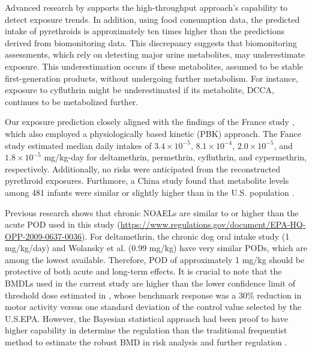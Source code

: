 \documentclass[toxics,article,submit,pdftex,moreauthors]{Definitions/mdpi}
\begin{document}
Advanced research by \citet{stanfield2024characterizing} supports the
high-throughput approach's capability to detect exposure trends. In
addition, using food consumption data, the predicted intake of
pyrethroids is approximately ten times higher than the predictions
derived from biomonitoring data. This discrepancy suggests that
biomonitoring assessments, which rely on detecting major urine
metabolites, may underestimate exposure. This underestimation occurs if
these metabolites, assumed to be stable first-generation products,
without undergoing further metabolism. For instance, exposure to
cyfluthrin might be underestimated if its metabolite, DCCA, continues to
be metabolized further.

Our exposure prediction closely aligned with the findings of the France study
\citep{quindroit2021estimating}, which also employed a physiologically based
kinetic (PBK) approach. The Fance study estimated median daily intakes of 
\(3.4 \times 10^{-5}\), \(8.1 \times 10^{-4}\), \(2.0 \times 10^{-5}\), and
\(1.8 \times 10^{-5}\) mg/kg-day for deltamethrin, permethrin, cyfluthrin, and
cypermethrin, respectively. Additionally, no risks were anticipated from the
reconstructed pyrethroid exposures. Furthmore, a China study found that
metabolite levels among 481 infants were similar or slightly higher than in the
U.S. population \citep{wu2013urinary}.

Previous research shows that chronic NOAELs are similar to or higher
than the acute POD used in this study
(\url{https://www.regulations.gov/document/EPA-HQ-OPP-2009-0637-0036}).
For deltamethrin, the chronic dog oral intake study (1 mg/kg/day) and
Wolansky et al. \citep{wolansky_relative_2006} (0.99 mg/kg) have very
similar PODs, which are among the lowest available. Therefore, POD of
approximately 1 mg/kg should be protective of both acute and long-term
effects. It is crucial to note that the BMDLs used in the current study
are higher than the lower confidence limit of threshold dose estimated
in \citep{wolansky_relative_2006}, whose benchmark response was a 30\%
reduction in motor activity versus one standard deviation of the control
value selected by the U.S.EPA. However, the Bayesian statistical
approach had been proof to have higher capability in determine the
regulation than the traditional frequentist method to estimate the
robust BMD in risk analysis and further regulation
\citep{desai_role_2024}.
\end{document}
